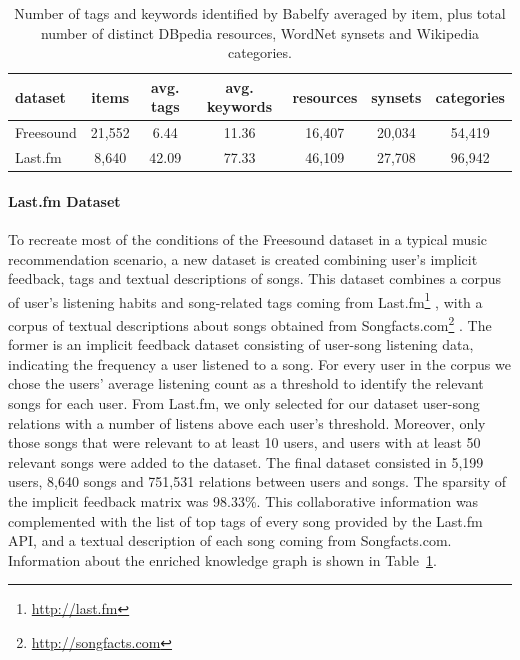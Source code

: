 \begin{table}
\scriptsize
	\label{tbl:graph-rec:datasets}
	\begin{tabular}{l c c c c c c}
		\toprule
		\textbf{dataset} & \textbf{items} & \textbf{avg. tags} & \textbf{avg. keywords} & \textbf{resources} & \textbf{synsets} & \textbf{categories}\\
		\midrule
		Freesound & 21,552 & 6.44 & 11.36 & 16,407 & 20,034 & 54,419 \\
		Last.fm & 8,640 & 42.09 & 77.33 & 46,109 & 27,708 & 96,942 \\
		\bottomrule
		
	\end{tabular}
	\caption{Number of tags and keywords identified by Babelfy averaged by item, plus total number of distinct DBpedia resources, WordNet synsets and Wikipedia categories.
	}
\end{table}


\paragraph*{\textbf{Last.fm Dataset}}\label{fs_dataset}
To recreate most of the conditions of the Freesound dataset in a typical music recommendation scenario, a new dataset is created combining user's implicit feedback, tags and textual descriptions of songs. This dataset combines a corpus of user's listening habits and song-related tags coming from Last.fm\footnote{\url{http://last.fm}} \cite{Vigliensoni2014}, with a corpus of textual descriptions about songs obtained from Songfacts.com\footnote{\url{http://songfacts.com}} \cite{Sordo2015}. The former is an implicit feedback dataset consisting of user-song listening data, indicating the frequency a user listened to a song. For every user in the corpus we chose the users' average listening count as a threshold to identify the relevant songs for each user. From Last.fm, we only selected for our dataset user-song relations with a number of listens above each user's threshold. Moreover, only those songs that were relevant to at least 10 users, and users with at least 50 relevant songs were added to the dataset. The final dataset consisted in 5,199 users, 8,640 songs and 751,531 relations between users and songs. The sparsity of the implicit feedback matrix was 98.33\%.
This collaborative information was complemented with the list of top tags of every song provided by the Last.fm API, and a textual description of each song coming from Songfacts.com. Information about the enriched knowledge graph is shown in Table~\ref{tbl:graph-rec:datasets}.


